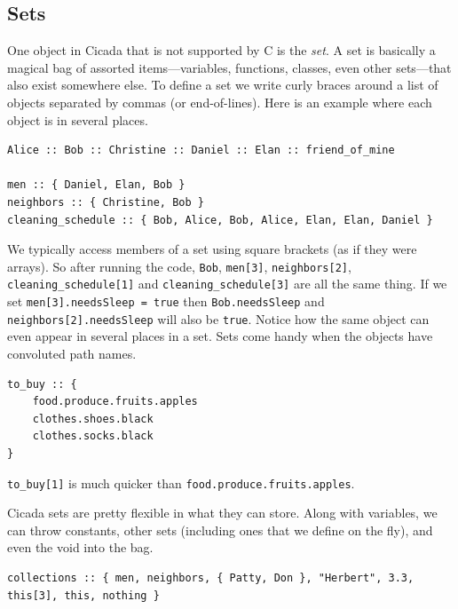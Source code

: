 \documentclass{article}
\newenvironment{code}{
       \begin{list}{}{
               \setlength{\leftmargin}{.4in}
               \setlength{\rightmargin}{0in}
               \setlength{\topsep}{.2in}
       }
       \small
       \item[] }
       { \end{list}   }
\begin{document}


\subsection{Sets} 

One object in Cicada that is not supported by C is the \emph{set}.  A set is basically a magical bag of assorted items---variables, functions, classes, even other sets---that also exist somewhere else.  To define a set we write curly braces around a list of objects separated by commas (or end-of-lines).  Here is an example where each object is in several places.

\begin{code} \begin{verbatim}
Alice :: Bob :: Christine :: Daniel :: Elan :: friend_of_mine

men :: { Daniel, Elan, Bob }
neighbors :: { Christine, Bob }
cleaning_schedule :: { Bob, Alice, Bob, Alice, Elan, Elan, Daniel }
\end{verbatim} \end{code}

\noindent We typically access members of a set using square brackets (as if they were arrays).  So after running the code, \texttt{Bob}, \texttt{men[3]}, \texttt{neighbors[2]}, \texttt{cleaning\_schedule[1]} and \texttt{cleaning\_schedule[3]} are all the same thing.  If we set \verb#men[3].needsSleep = true# then \verb#Bob.needsSleep# and \verb#neighbors[2].needsSleep# will also be \verb#true#.  Notice how the same object can even appear in several places in a set.  Sets come handy when the objects have convoluted path names.

\begin{code} \begin{verbatim}
to_buy :: {
    food.produce.fruits.apples
    clothes.shoes.black
    clothes.socks.black
}
\end{verbatim} \end{code}

\noindent \verb#to_buy[1]# is much quicker than \texttt{food.produce.fruits.apples}.

Cicada sets are pretty flexible in what they can store.  Along with variables, we can throw constants, other sets (including ones that we define on the fly), and even the void into the bag.

\begin{code} \begin{verbatim}
collections :: { men, neighbors, { Patty, Don }, "Herbert", 3.3, this[3], this, nothing }
\end{verbatim} \end{code}
\end{document}
